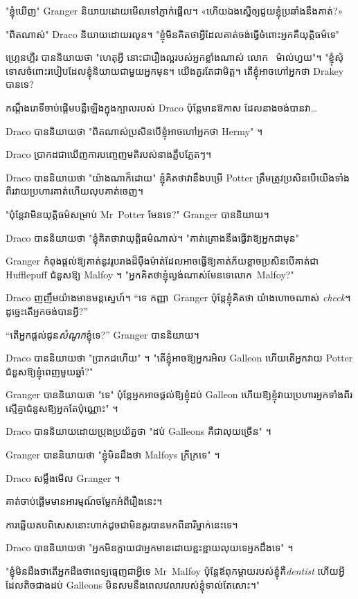 {"ខ្ញុំឃើញ" Granger និយាយដោយមើលទៅភ្ញាក់ផ្អើល។ «ហើយ​ឯង​ស្នើ​ឲ្យ​ជួយ​ខ្ញុំ​ប្រឆាំង​នឹង​គាត់?»

"ពិតណាស់" Draco និយាយដោយរលូន។ "ខ្ញុំមិនគិតថាអ្វីដែលគាត់ចង់ធ្វើចំពោះអ្នកគឺយុត្តិធម៌ទេ"

ហ្គ្រេនហ្គឺរ បាននិយាយថា "ហេតុអ្វី នោះជារឿងល្អរបស់អ្នកខ្លាំងណាស់ លោក~ ម៉ាល់ហ្វយ"។ "ខ្ញុំសុំទោសចំពោះរបៀបដែលខ្ញុំនិយាយជាមួយអ្នកមុន។ យើងគួរតែជាមិត្ត។ តើខ្ញុំអាចហៅអ្នកថា Drakey បានទេ?

កណ្តឹង​រោទិ៍​ចាប់​ផ្ដើម​បន្លឺ​ឡើង​ក្នុង​ក្បាល​របស់ Draco ប៉ុន្តែ​មាន​ឱកាស \emph{} ដែល​នាង​ចង់​បាន​វា…

Draco បាននិយាយថា "ពិតណាស់ប្រសិនបើខ្ញុំអាចហៅអ្នកថា Hermy" ។

Draco ប្រាកដ​ជា​ឃើញ​ការ​បញ្ចេញ​មតិ​របស់​នាង​ភ្លឹបភ្លែតៗ។

Draco បាននិយាយថា "យ៉ាងណាក៏ដោយ" ខ្ញុំគិតថាវានឹងបម្រើ Potter ត្រឹមត្រូវប្រសិនបើយើងទាំងពីរវាយប្រហារគាត់ហើយលុបគាត់ចេញ។

"ប៉ុន្តែវាមិនយុត្តិធម៌សម្រាប់ Mr~Potter មែនទេ?" Granger បាននិយាយ។

Draco បាននិយាយថា "ខ្ញុំគិតថាវាយុត្តិធម៌ណាស់។ "គាត់គ្រោងនឹងធ្វើវាឱ្យអ្នកជាមុន"

Granger កំពុងផ្តល់ឱ្យគាត់នូវរូបរាងដ៏ម៉ឺងម៉ាត់ដែលអាចធ្វើឱ្យគាត់ភ័យខ្លាចប្រសិនបើគាត់ជា Hufflepuff ជំនួសឱ្យ Malfoy ។ "អ្នកគិតថាខ្ញុំល្ងង់ណាស់មែនទេលោក~Malfoy?"

Draco ញញឹមយ៉ាងមានមន្តស្នេហ៍។ “ទេ កញ្ញា~Granger ប៉ុន្តែខ្ញុំគិតថា យ៉ាងហោចណាស់ \emph{check}។ ដូច្នេះតើអ្នកចង់បានអ្វី?”

“តើអ្នកផ្តល់ជូន\emph{សំណូក}ខ្ញុំទេ?” Granger បាននិយាយ។

Draco បាននិយាយថា "ប្រាកដហើយ" ។ "តើខ្ញុំអាចឱ្យអ្នករអិល Galleon ហើយតើអ្នកវាយ Potter ជំនួសឱ្យខ្ញុំពេញមួយឆ្នាំ?"

Granger បាននិយាយថា "ទេ" ប៉ុន្តែអ្នកអាចផ្តល់ឱ្យខ្ញុំដប់ Galleon ហើយឱ្យខ្ញុំវាយប្រហារអ្នកទាំងពីរស្មើគ្នាជំនួសឱ្យអ្នកតែប៉ុណ្ណោះ" ។

Draco បាននិយាយដោយប្រុងប្រយ័ត្នថា "ដប់ Galleons គឺជាលុយច្រើន" ។

Granger បាននិយាយថា "ខ្ញុំមិនដឹងថា Malfoys ក្រីក្រទេ" ។

Draco សម្លឹងមើល Granger ។

គាត់ចាប់ផ្តើមមានអារម្មណ៍ចម្លែកអំពីរឿងនេះ។

ការ​ឆ្លើយ​តប​ពិសេស​នោះ​ហាក់​ដូច​ជា​មិន​គួរ​បាន​មក​ពី​នារី​ម្នាក់​នេះ​ទេ។

Draco បាននិយាយថា "អ្នកមិនក្លាយជាអ្នកមានដោយខ្ជះខ្ជាយលុយទេអ្នកដឹងទេ" ។

"ខ្ញុំមិនដឹងថាតើអ្នកដឹងថាពេទ្យធ្មេញជាអ្វីទេ Mr~Malfoy ប៉ុន្តែឪពុកម្តាយរបស់ខ្ញុំគឺ\emph{dentist} ហើយអ្វីដែលតិចជាងដប់ Galleons មិនសមនឹងពេលវេលារបស់ខ្ញុំទាល់តែសោះ។"

}
